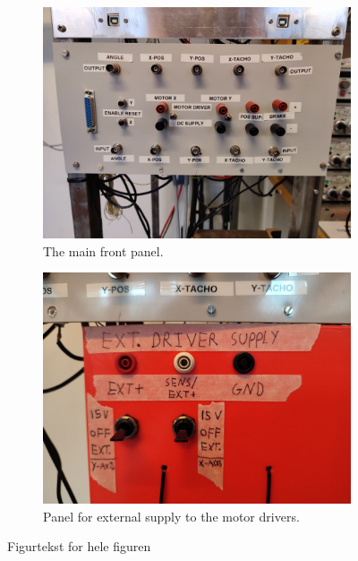 \begin{figure}[H]
    \centering
    \begin{subfigure}[b]{0.47\textwidth}
        \centering
        \includegraphics[width=\textwidth]{pictures/front_panel.jpg}
        \caption{The main front panel.}
        \label{fig:front_panel}
    \end{subfigure}
    \hfill
    \begin{subfigure}[b]{0.47\textwidth}
        \centering
        \includegraphics[width=\textwidth]{pictures/power_supply_panel.jpg}
        \caption{Panel for external supply to the motor drivers.}
        \label{fig:power_supply_panel}
    \end{subfigure}
    \caption{Figurtekst for hele figuren}
    \label{fig:crane_front}
\end{figure}


